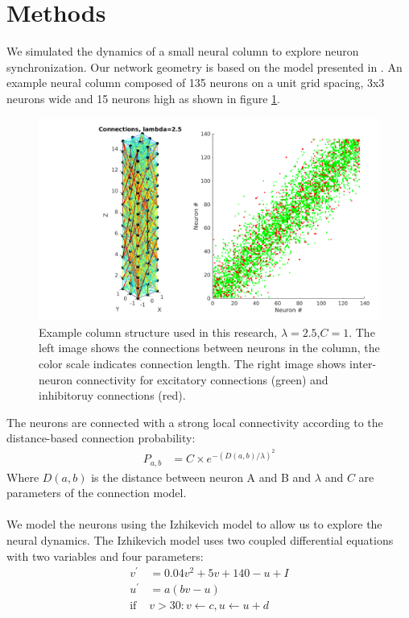 \documentclass[a4paper,11pt]{article}
\begin{document}
\section{Methods}
We simulated the dynamics of a small neural column to explore neuron synchronization.
Our network geometry is based on the model presented in \cite{markram1998}.
An example neural column composed of 135 neurons on a unit grid spacing, 3x3 neurons wide and 15 neurons high as shown in figure \ref{fig:column_structure}.
\begin{figure}[!htb]
 \caption{Example column structure used in this research, $\lambda=2.5$,$C=1$. The left image shows the connections between neurons in the column, the color scale indicates connection length. The right image shows inter-neuron connectivity for excitatory connections (green) and inhibitoruy connections (red).}
 \label{fig:column_structure}
 \centering
   \includegraphics[width=\textwidth]{fig/lambda2}
\end{figure}
The neurons are connected with a strong local connectivity according to the distance-based connection probability:
\begin{align}\label{eq:connectivity}
 P_{a,b} &= C \times e^{-(D(a,b)/\lambda)^2}
\end{align}
Where $D(a,b)$ is the distance between neuron A and B and $\lambda$ and $C$ are parameters of the connection model.
\\ \\
We model the neurons using the Izhikevich model \cite{izhikevich2003} to allow us to explore the neural dynamics.
The Izhikevich model uses two coupled differential equations with two variables and four parameters:
\begin{align}
 v^\prime &= 0.04v^2+5v+140-u+I\\
 u^\prime &= a(bv-u)\\
 \text{if } &v>30: v\leftarrow c, u\leftarrow u+d
\end{align}
\end{document}

